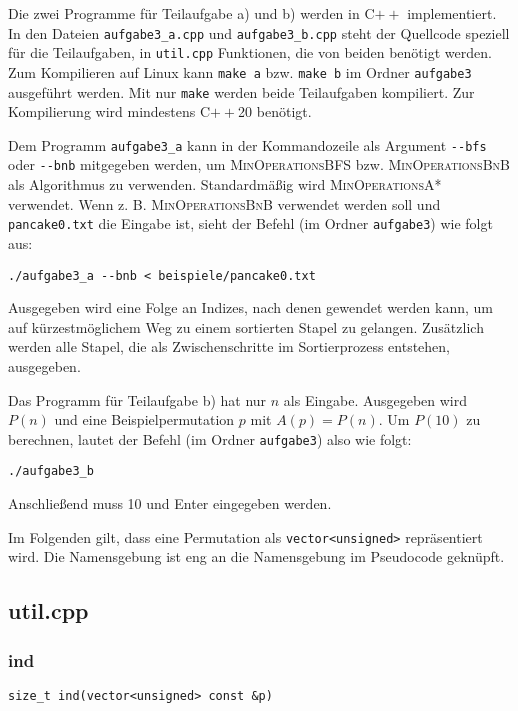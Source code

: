 \documentclass[a4paper, 10pt, ngerman]{article}
\begin{document}
Die zwei Programme für Teilaufgabe a) und b) werden in C$++$ implementiert. In den Dateien \verb|aufgabe3_a.cpp| und \verb|aufgabe3_b.cpp| steht der Quellcode speziell für die Teilaufgaben, in \verb|util.cpp| Funktionen, die von beiden benötigt werden. Zum Kompilieren auf Linux kann \verb|make a| bzw. \verb|make b| im Ordner \verb|aufgabe3| ausgeführt werden. Mit nur \verb|make| werden beide Teilaufgaben kompiliert. Zur Kompilierung wird mindestens C$++$20 benötigt. 

Dem Programm \verb|aufgabe3_a| kann in der Kommandozeile als Argument \verb|--bfs| oder \verb|--bnb| mitgegeben werden, um \textsc{MinOperationsBFS} bzw. \textsc{MinOperationsBnB} als Algorithmus zu verwenden. Standardmäßig wird \textsc{MinOperationsA*} verwendet. Wenn z. B. \textsc{MinOperationsBnB} verwendet werden soll und \verb|pancake0.txt| die Eingabe ist, sieht der Befehl (im Ordner \verb|aufgabe3|) wie folgt aus:

\medskip
\verb|./aufgabe3_a --bnb < beispiele/pancake0.txt|
\medskip

Ausgegeben wird eine Folge an Indizes, nach denen gewendet werden kann, um auf kürzestmöglichem Weg zu einem sortierten Stapel zu gelangen. Zusätzlich werden alle Stapel, die als Zwischenschritte im Sortierprozess entstehen, ausgegeben.

Das Programm für Teilaufgabe b) hat nur $n$ als Eingabe. Ausgegeben wird $P(n)$ und eine Beispielpermutation $p$ mit $A(p) = P(n)$. Um $P(10)$ zu berechnen, lautet der Befehl (im Ordner \verb|aufgabe3|) also wie folgt:

\medskip
\verb|./aufgabe3_b|
\medskip

Anschließend muss 10 und Enter eingegeben werden.

Im Folgenden gilt, dass eine Permutation als \verb|vector<unsigned>| repräsentiert wird. Die Namensgebung ist eng an die Namensgebung im Pseudocode geknüpft.

\subsection{util.cpp}

\subsubsection{ind}
\verb|size_t ind(vector<unsigned> const &p)|
\medskip
\end{document}
